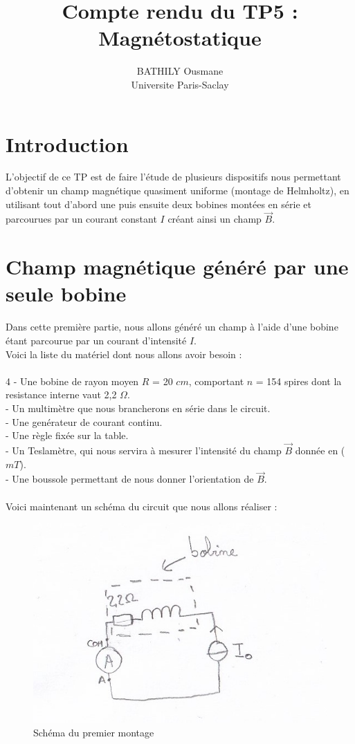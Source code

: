 \documentclass[12pt,a4paper]{article}
\title{Compte rendu du TP5 : Magnétostatique}
\author{BATHILY Ousmane \\ Universite Paris-Saclay}
\date{}
\begin{document}
\renewcommand{\tablename}{Tableau}

\maketitle
\section{Introduction}
L'objectif de ce TP est de faire l'étude de plusieurs dispositifs nous permettant d'obtenir un champ magnétique quasiment uniforme (montage de Helmholtz), en utilisant tout d'abord une puis ensuite deux  bobines montées en série et parcourues par un courant constant $I$ créant ainsi un champ $\vec{B}$.
\section{Champ magnétique généré par une seule bobine}
Dans cette première partie, nous allons généré un champ à l'aide d'une bobine étant parcourue par un courant d'intensité $I$.\\
Voici la liste du matériel dont nous allons avoir besoin :\\
\\4
- Une bobine de rayon moyen $R$ = 20 $cm$, comportant $n$ = 154 spires dont la resistance interne vaut 2,2 $\Omega$.\\
- Un multimètre que nous brancherons en série dans le circuit.\\
- Une genérateur de courant continu.\\
- Une règle fixée sur la table.\\
- Un Teslamètre, qui nous servira à mesurer l'intensité du champ $\vec{B}$ donnée en ($mT$).\\
- Une boussole permettant de nous donner l'orientation de $\vec{B}$.\\
\\
Voici maintenant un schéma du circuit que nous allons réaliser : \\
\begin{figure}[H]
\begin{center}
\includegraphics[scale=1]{circuit1.jpg}   
\caption{Schéma du premier montage}
\end{center}
\end{figure}
\end{document}
